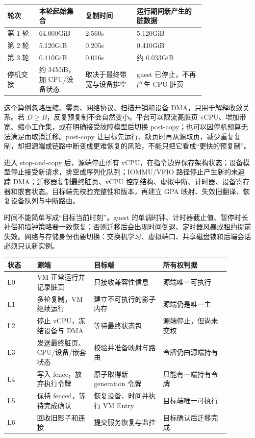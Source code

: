 \begin{longtable}{L{0.13\linewidth}L{0.18\linewidth}L{0.21\linewidth}L{0.28\linewidth}}
\toprule
轮次 & 本轮起始集合 & 复制时间 & 运行期间新产生的脏数据 \\
\midrule
第 1 轮 & 64.000GiB & 2.560s & 5.120GiB \\\tablerowrule
第 2 轮 & 5.120GiB & 0.205s & 0.410GiB \\\tablerowrule
第 3 轮 & 0.410GiB & 0.016s & 约 0.033GiB \\\tablerowrule
停机交接 & 约 34MiB，加 CPU/设备状态 & 取决于最终带宽与设备排空 & guest 已停止，不再产生 CPU 脏页 \\
\bottomrule
\end{longtable}

这个算例忽略压缩、零页、网络协议、扫描开销和设备 DMA，只用于解释收敛关系。若 $D\ge B$，反复预复制不会自然变小。平台可以限流高脏页 vCPU、增加带宽、缩小工作集，或在明确接受故障模型后切换 post-copy；也可以因停机预算无法满足而取消迁移。post-copy 让目标先运行、缺页时再从源取页，减少重复复制，却把源端或链路中断变成更难恢复的风险，不能只把它看成“更快的预复制”。\cite{qemu-postcopy}


进入 stop-and-copy 后，源端停止所有 vCPU，在指令边界保存架构状态；设备模型停止接受新请求，排空或序列化队列；IOMMU/VFIO 路径停止产生新的未追踪 DMA；迁移器复制最终脏页、vCPU 控制结构、虚拟中断、计时器、设备寄存器和嵌套状态。目标端先校验完整性和版本，再建立 GPA 映射、失效旧翻译、恢复设备队列与中断路由。

时间不能简单写成“目标当前时刻”。guest 的单调时钟、计时器截止值、暂停时长补偿和墙钟策略要一致恢复；否则迁移后会出现时间倒退、定时器风暴或租约提前失效。网络与存储身份也要切换：交换机学习、虚拟端口、共享磁盘锁和后端会话必须只认新实例。

\begin{longtable}{L{0.12\linewidth}L{0.23\linewidth}L{0.28\linewidth}L{0.27\linewidth}}
\toprule
状态 & 源端 & 目标端 & 所有权判据 \\
\midrule
L0 & VM 正常运行并记录脏页 & 只接收兼容性信息 & 源端唯一可执行 \\\tablerowrule
L1 & 多轮复制，VM 继续运行 & 建立不可执行的影子内存 & 源端仍是唯一主 \\\tablerowrule
L2 & 停止 vCPU，冻结设备与 DMA & 等待最终状态包 & 源端停止，但尚未交权 \\\tablerowrule
L3 & 发送最终脏页、CPU/设备/嵌套状态 & 校验并准备映射与路由 & 令牌仍由源端持有 \\\tablerowrule
L4 & 写入 fence，放弃执行令牌 & 原子取得新 generation 令牌 & 只能有一端持有令牌 \\\tablerowrule
L5 & 保持 fenced，等待完成确认 & 恢复设备、时间并执行 VM Entry & 目标端唯一可执行 \\\tablerowrule
L6 & 回收旧影子和连接 & 提交服务恢复与监控 & 目标确认后迁移完成 \\
\bottomrule
\end{longtable}

